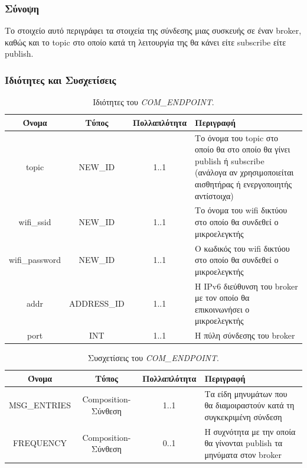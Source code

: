 \subsubsection*{Σύνοψη}

\noindent Το στοιχείο αυτό περιγράφει τα στοιχεία της σύνδεσης μιας συσκευής σε έναν broker, καθώς και το topic στο οποίο κατά τη λειτουργία της θα κάνει είτε subscribe είτε publish.

\subsubsection*{Ιδιότητες και Συσχετίσεις}

\begin{table}[H]
	\begin{center}
		\caption{Ιδιότητες του \textit{COM\_ENDPOINT}.}
		\label{tab:com_endpoint1}
		\begin{tabular}{ | c | c | c| m{5.5cm} | }
			\hline
			\rowcolor{Gray}
			Όνομα & Τύπος & Πολλαπλότητα & Περιγραφή \\
			\hline
			topic & NEW\_ID & 1..1 & Το όνομα του topic στο οποίο θα στο οποίο θα γίνει publish ή subscribe (ανάλογα αν χρησιμοποιείται αισθητήρας ή ενεργοποιητής αντίστοιχα) \\
			\hline
			wifi\_ssid & NEW\_ID & 1..1 & Το όνομα του wifi δικτύου στο οποίο θα συνδεθεί ο μικροελεγκτής \\
			\hline
			wifi\_password & NEW\_ID & 1..1 & Ο κωδικός του wifi δικτύου στο οποίο θα συνδεθεί ο μικροελεγκτής \\
			\hline
			addr & ADDRESS\_ID & 1..1 & Η IPv6 διεύθυνση του broker με τον οποίο θα επικοινωνήσει ο μικροελεγκτής \\
			\hline
			port & INT & 1..1 & Η πύλη σύνδεσης του broker \\
			\hline
		\end{tabular}
	\end{center}
\end{table}

\begin{table}[H]
	\begin{center}
		\caption{Συσχετίσεις του \textit{COM\_ENDPOINT}.}
		\label{tab:com_endpoint2}
		\begin{tabular}{ | c | c | c| m{5.5cm} | }
			\hline
			\rowcolor{Gray}
			Όνομα & Τύπος & Πολλαπλότητα & Περιγραφή \\
			\hline
			MSG\_ENTRIES & Composition-Σύνθεση & 1..1 &  Τα είδη μηνυμάτων που θα διαμοιραστούν κατά τη συγκεκριμένη σύνδεση \\
			\hline
			FREQUENCY & Composition-Σύνθεση & 0..1 &  Η συχνότητα με την οποία θα γίνονται publish τα μηνύματα στον broker \\
			\hline
		\end{tabular}
	\end{center}
\end{table}

